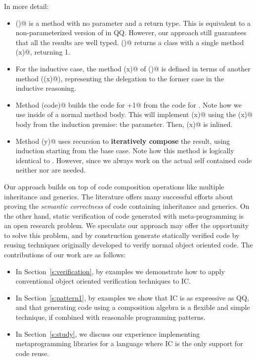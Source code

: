 \noindent In more detail:
\begin{itemize}
\item
\Q@base()@ is a method with no parameter and a \Q@Library@ return type.
This is equivalent to a non-parameterized version of \Q@Expr@ in QQ.
However, our approach still guarantees that all the results are well typed.
\Q@base()@ returns a class with a single method \Q@pow(x)@,
returning 1.
\item
For the inductive case, the method \Q@pow(x)@ of \Q@inductive()@ is defined in terms of
another method (\Q@superPow(x)@), representing the delegation to
the former case in the inductive reasoning.
\item Method \Q@inductive(code)@ builds
the code for \Q@x+1@ from the code for \Q@x@.
Note how we use \Q@Override@ inside of a normal method body.
This \Q@Override@ will implement
\Q@superPow(x)@ using
the \Q@pow(x)@ body from the induction premise: the \Q@code@ parameter.
Then, \Q@superPow(x)@ is inlined.

\item Method \Q@generate(y)@ uses recursion to \textbf{iteratively compose} the result, using induction starting from
the base case.
Note how this method is logically identical to \Q@powerAux@. However,
since we always work on the actual self contained code neither \Q@lambdaX@ nor \Q@compile@ are needed.
\end{itemize}
Our approach builds on top of code composition operations like multiple inheritance and generics.
The literature offers \cite{barnett2004spec,burdy2005overview,muller2016viper} many successful efforts about proving the
\emph{semantic correctness} 
of code containing inheritance and generics.
On the other hand, static verification of code generated with meta-programming is an open research problem.
We speculate our approach may offer the opportunity to solve this problem,
and by construction generate statically verified code
by reusing techniques originally developed to verify normal object oriented code.
The contributions of our work are as follows:
\begin{itemize}
\item
In Section~\ref{s:verification},
by examples we demonstrate how to apply conventional object oriented verification techniques to IC.

\item
In Section~\ref{s:pattern1},
by examples we show that IC is as expressive as QQ, and that
generating code using a composition algebra
is a flexible and simple technique, if combined with
reasonable programming patterns.
\item In Section~\ref{s:study}, we discuss our experience implementing metaprogramming libraries for a language where IC is the only support for code reuse. 
\end{itemize}

